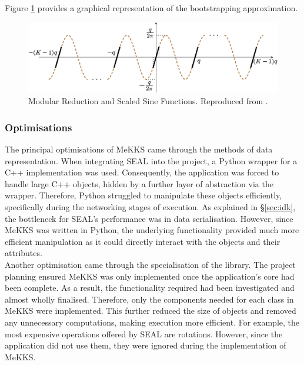 \smallskip \\ \indent
Figure \ref{fig:bootstrapping} provides a graphical representation of the bootstrapping approximation.
\begin{figure}[ht]
    \centering
    \includegraphics[scale=0.3]{figures/bootstrapping.png}
    \caption[Bootstrapping Procedure]{Modular Reduction and Scaled Sine Functions. Reproduced from \cite{BootstrappingHEAAN}.}
    \label{fig:bootstrapping}
\end{figure}

\setlength{\leftskip}{0cm}
\subsubsection{Optimisations}
\setlength{\leftskip}{0.5cm}
\indent \indent
The principal optimisations of MeKKS came through the methods of data representation. When integrating SEAL into the project, a Python wrapper for a C++ implementation was used. Consequently, the application was forced to handle large C++ objects, hidden by a further layer of abstraction via the wrapper. Therefore, Python struggled to manipulate these objects efficiently, specifically during the networking stages of execution. As explained in §\ref{sec:idk}, the bottleneck for SEAL's performance was in data serialisation. However, since MeKKS was written in Python, the underlying functionality provided much more efficient manipulation as it could directly interact with the objects and their attributes.
\smallskip \\ \indent
Another optimisation came through the specialisation of the library. The project planning ensured MeKKS was only implemented once the application's core had been complete. As a result, the functionality required had been investigated and almost wholly finalised. Therefore, only the components needed for each class in MeKKS were implemented. This further reduced the size of objects and removed any unnecessary computations, making execution more efficient. For example, the most expensive operations offered by SEAL are rotations. However, since the application did not use them, they were ignored during the implementation of MeKKS.

